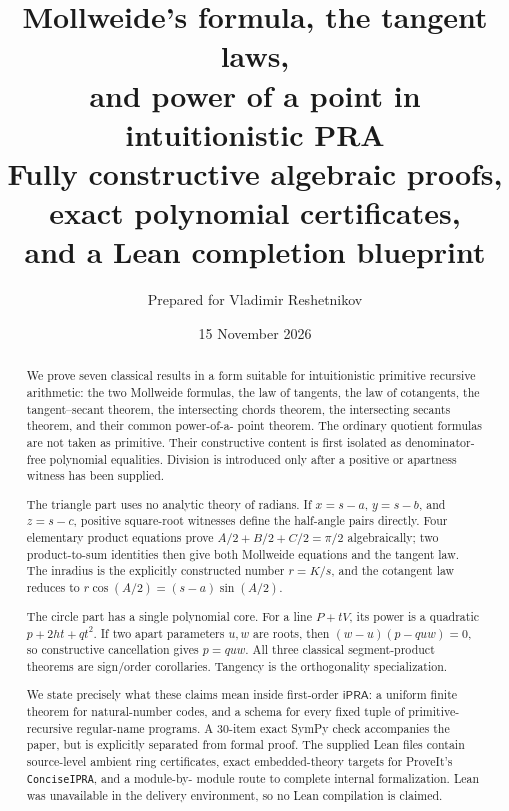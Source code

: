 \documentclass[11pt,letterpaper]{article}
\title{\textbf{Mollweide's formula, the tangent laws,\\
and power of a point in intuitionistic PRA}\\[6pt]
\large Fully constructive algebraic proofs, exact polynomial certificates,\\
and a Lean completion blueprint}
\author{Prepared for Vladimir Reshetnikov}
\date{15 November 2026}
\theoremstyle{definition}
\theoremstyle{remark}
\newcommand{\ipra}{\mathsf{iPRA}}
\begin{document}
\maketitle

\begin{abstract}
We prove seven classical results in a form suitable for intuitionistic
primitive recursive arithmetic: the two Mollweide formulas, the law of
tangents, the law of cotangents, the tangent--secant theorem, the intersecting
chords theorem, the intersecting secants theorem, and their common power-of-a-
point theorem.  The ordinary quotient formulas are not taken as primitive.
Their constructive content is first isolated as denominator-free polynomial
equalities.  Division is introduced only after a positive or apartness witness
has been supplied.

The triangle part uses no analytic theory of radians.  If
\(x=s-a\), \(y=s-b\), and \(z=s-c\), positive square-root witnesses define the
half-angle pairs directly.  Four elementary product equations prove
\(A/2+B/2+C/2=\pi/2\) algebraically; two product-to-sum identities then give
both Mollweide equations and the tangent law.  The inradius is the explicitly
constructed number \(r=K/s\), and the cotangent law reduces to
\(r\cos(A/2)=(s-a)\sin(A/2)\).

The circle part has a single polynomial core.  For a line
\(P+tV\), its power is a quadratic
\(p+2ht+qt^2\).  If two apart parameters \(u,w\) are roots, then
\((w-u)(p-quw)=0\), so constructive cancellation gives \(p=quw\).  All three
classical segment-product theorems are sign/order corollaries.  Tangency is the
orthogonality specialization.

We state precisely what these claims mean inside first-order \(\ipra\): a
uniform finite theorem for natural-number codes, and a schema for every fixed
tuple of primitive-recursive regular-name programs.  A 30-item exact SymPy
check accompanies the paper, but is explicitly separated from formal proof.
The supplied Lean files contain source-level ambient ring certificates, exact
embedded-theory targets for ProveIt's \texttt{ConciseIPRA}, and a module-by-
module route to complete internal formalization.  Lean was unavailable in the
delivery environment, so no Lean compilation is claimed.
\end{abstract}
\end{document}
